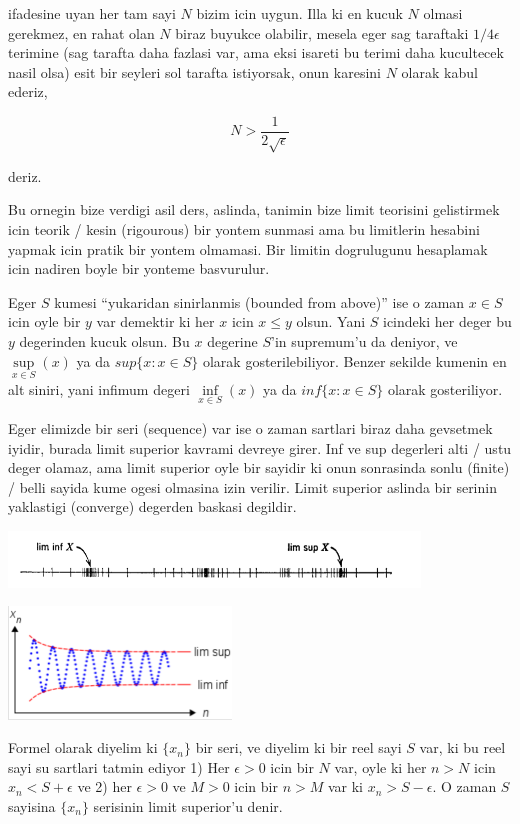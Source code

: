 \documentclass[12pt,fleqn]{article}
\begin{document}
ifadesine uyan her tam sayi $N$ bizim icin uygun. Illa ki en kucuk $N$
olmasi gerekmez, en rahat olan $N$ biraz buyukce olabilir, mesela eger sag
taraftaki $1/4\epsilon$ terimine (sag tarafta daha fazlasi var, ama eksi
isareti bu terimi daha kucultecek nasil olsa) esit bir seyleri sol tarafta
istiyorsak, onun karesini $N$ olarak kabul ederiz,

\[ N > \frac{1}{2\sqrt{\epsilon}} \]

deriz. 

Bu ornegin bize verdigi asil ders, aslinda, tanimin bize limit teorisini
gelistirmek icin teorik / kesin (rigourous) bir yontem sunmasi ama bu
limitlerin hesabini yapmak icin pratik bir yontem olmamasi. Bir limitin
dogrulugunu hesaplamak icin nadiren boyle bir yonteme basvurulur. 


\vspace{10cm}

Eger $S$ kumesi ``yukaridan sinirlanmis (bounded from above)'' ise o zaman
$x \in S$ icin oyle bir $y$ var demektir ki her $x$ icin $x \le y$
olsun. Yani $S$ icindeki her deger bu $y$ degerinden kucuk olsun. Bu $x$
degerine $S$'in supremum'u da deniyor, ve $\sup\limits_{x \in S}(x)$ ya da
$sup\{x:x \in S\}$ olarak gosterilebiliyor. Benzer sekilde kumenin en alt
siniri, yani infimum degeri $\inf\limits_{x \in S}(x)$ ya da $inf\{x:x \in
S\}$ olarak gosteriliyor. 

Eger elimizde bir seri (sequence) var ise o zaman sartlari biraz daha
gevsetmek iyidir, burada limit superior kavrami devreye girer. Inf ve sup
degerleri alti / ustu deger olamaz, ama limit superior oyle bir sayidir ki
onun sonrasinda sonlu (finite) / belli sayida kume ogesi olmasina izin
verilir. Limit superior aslinda bir serinin yaklastigi (converge) degerden
baskasi degildir. 

\includegraphics[height=1.5cm]{1_01.png}

\includegraphics[height=3cm]{1_02.png}

Formel olarak diyelim ki $\{x_n\}$ bir seri, ve diyelim ki bir reel
sayi $S$ var, ki bu reel sayi su sartlari tatmin ediyor 
1) Her $\epsilon > 0$ icin bir $N$ var, oyle ki her $n>N$ icin $x_n
< S + \epsilon$ 
ve 2) her $\epsilon > 0$ ve $M>0$ icin bir  $n>M$ var ki $x_n
> S - \epsilon$. O 
zaman $S$ sayisina  $\{x_n\}$ serisinin limit superior'u denir. 
\end{document}

